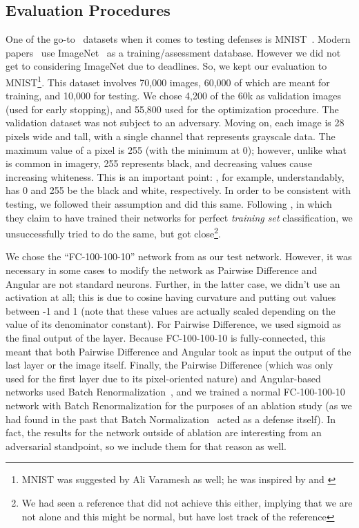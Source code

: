 \subsection{Evaluation Procedures}

One of the go-to~\cite{szegedy2014intriguing, kannan2018adversarial} datasets when it comes to
testing defenses is MNIST~\cite{lecun}. Modern papers~\cite{kannan2018adversarial,
tramèr2020ensemble} use ImageNet~\cite{ILSVRC15} as a training/assessment database. However we did
not get to considering ImageNet due to deadlines. So, we kept our evaluation to MNIST\footnote{MNIST
was suggested by Ali Varamesh as well; he was inspired by \cite{szegedy2014intriguing} and
\cite{goodfellow2015explaining}}. This dataset involves 70,000 images, 60,000 of which are meant for
training, and 10,000 for testing. We chose 4,200 of the 60k as validation images (used for early
stopping), and 55,800 used for the optimization procedure. The validation dataset was not subject to
an adversary. Moving on, each image is 28 pixels wide and tall, with a single channel that
represents grayscale data. The maximum value of a pixel is 255 (with the minimum at 0); however,
unlike what is common in imagery, 255 represents black, and decreasing values cause increasing
whiteness. This is an important point: \cite{szegedy2014intriguing}, for example, understandably,
has 0 and 255 be the black and white, respectively. In order to be consistent with testing, we
followed their assumption and did this same. Following \cite{szegedy2014intriguing}, in which they
claim to have trained their networks for perfect \textit{training set} classification, we
unsuccessfully tried to do the same, but got close\footnote{We had seen a reference that did not
achieve this either, implying that we are not alone and this might be normal, but have lost track of
the reference}.

We chose the ``FC-100-100-10'' network from \cite{szegedy2014intriguing} as our test network.
However, it was necessary in some cases to modify the network as Pairwise Difference and Angular are
not standard neurons. Further, in the latter case, we didn't use an activation at all; this is due
to cosine having curvature and putting out values between -1 and 1 (note that these values are
actually scaled depending on the value of its denominator constant). For Pairwise Difference, we
used sigmoid as the final output of the layer. Because FC-100-100-10 is fully-connected, this meant
that both Pairwise Difference and Angular took as input the output of the last layer or the image
itself. Finally, the Pairwise Difference (which was only used for the first layer due to its
pixel-oriented nature) and Angular-based networks used Batch Renormalization~\cite{ioffe2017batch},
and we trained a normal FC-100-100-10 network with Batch Renormalization for the purposes of an
ablation study (as we had found in the past that Batch Normalization~\cite{ioffe2015batch} acted as
a defense itself). In fact, the results for the network outside of ablation are interesting from an
adversarial standpoint, so we include them for that reason as well.

